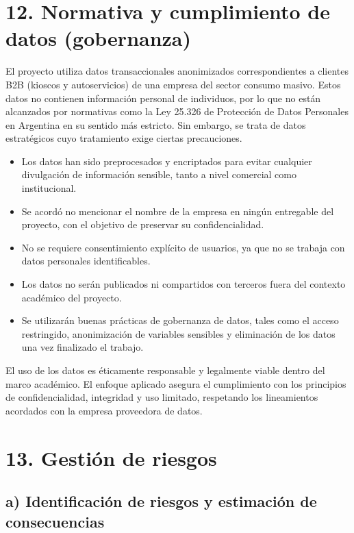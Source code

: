 \documentclass[
11pt, %
]{charter}
\begin{document}
\begin{longtable}{|l|l|>{\raggedright\arraybackslash}p{5cm}|l|l|l|}
\end{longtable}

\section{12. Normativa y cumplimiento de datos (gobernanza)}

El proyecto utiliza datos transaccionales anonimizados correspondientes a clientes B2B (kioscos y autoservicios) de una empresa del sector consumo masivo. Estos datos no contienen información personal de individuos, por lo que no están alcanzados por normativas como la Ley 25.326 de Protección de Datos Personales en Argentina en su sentido más estricto. Sin embargo, se trata de datos estratégicos cuyo tratamiento exige ciertas precauciones.

\begin{itemize}
\item Los datos han sido preprocesados y encriptados para evitar cualquier divulgación de información sensible, tanto a nivel comercial como institucional.
\item Se acordó no mencionar el nombre de la empresa en ningún entregable del proyecto, con el objetivo de preservar su confidencialidad.
\item No se requiere consentimiento explícito de usuarios, ya que no se trabaja con datos personales identificables.
\item Los datos no serán publicados ni compartidos con terceros fuera del contexto académico del proyecto.
\item Se utilizarán buenas prácticas de gobernanza de datos, tales como el acceso restringido, anonimización de variables sensibles y eliminación de los datos una vez finalizado el trabajo.
\end{itemize}

El uso de los datos es éticamente responsable y legalmente viable dentro del marco académico. El enfoque aplicado asegura el cumplimiento con los principios de confidencialidad, integridad y uso limitado, respetando los lineamientos acordados con la empresa proveedora de datos.

\section{13. Gestión de riesgos}
\label{sec:riesgos}

\subsection*{a) Identificación de riesgos y estimación de consecuencias}
\end{document}
